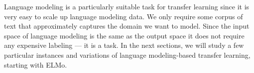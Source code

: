 Language modeling is a particularly suitable task for transfer learning since it is very easy to scale up language modeling data. We only require some corpus of text that approximately captures the domain we want to model. Since the input space of language modeling is the same as the output space it does not require any expensive labeling — it is a  task. In the next sections, we will study a few particular instances and variations of language modeling-based transfer learning, starting with ELMo. 